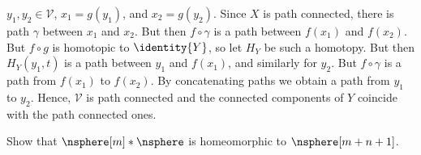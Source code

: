 \begin{solution}
        $y_{1},y_{2}\in\mathcal{V}$, $x_{1}=g(y_{1})$, and $x_{2}=g(y_{2})$.
        Since $X$ is path connected, there is path $\gamma$ between $x_{1}$ and
        $x_{2}$. But then $f\circ\gamma$ is a path between $f(x_{1})$ and
        $f(x_{2})$. But $f\circ{g}$ is homotopic to $\identity{Y}$, so let
        $H_{Y}$ be such a homotopy. But then $H_{Y}(y_{1},t)$ is a path between
        $y_{1}$ and $f(x_{1})$, and similarly for $y_{2}$. But $f\circ\gamma$
        is a path from $f(x_{1})$ to $f(x_{2})$. By concatenating paths we
        obtain a path from $y_{1}$ to $y_{2}$. Hence, $\mathcal{V}$ is path
        connected and the connected components of $Y$ coincide with the path
        connected ones.
    \end{solution}
    \begin{problem}
        Show that $\nsphere[m]*\nsphere$ is homeomorphic to $\nsphere[m+n+1]$.
    \end{problem}

